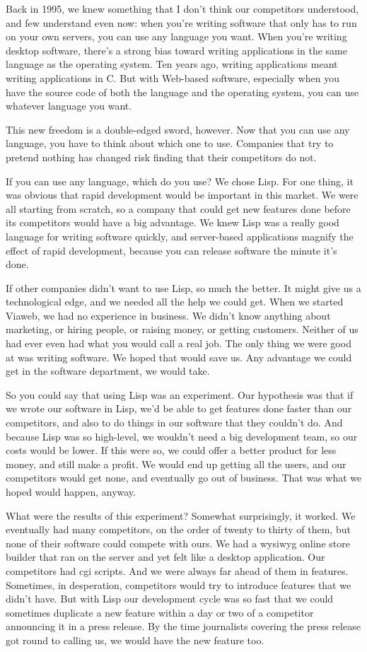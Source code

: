 Back in 1995, we knew something that I don't think our competitors
understood, and few understand even now: when you're writing software
that only has to run on your own servers, you can use any language you
want. When you're writing desktop software, there's a strong bias toward
writing applications in the same language as the operating system. Ten
years ago, writing applications meant writing applications in C. But
with Web-based software, especially when you have the source code of
both the language and the operating system, you can use whatever
language you want.

This new freedom is a double-edged sword, however. Now that you can use
any language, you have to think about which one to use. Companies that
try to pretend nothing has changed risk finding that their competitors
do not.

If you can use any language, which do you use? We chose Lisp. For one
thing, it was obvious that rapid development would be important in this
market. We were all starting from scratch, so a company that could get
new features done before its competitors would have a big advantage. We
knew Lisp was a really good language for writing software quickly, and
server-based applications magnify the effect of rapid development,
because you can release software the minute it's done.

If other companies didn't want to use Lisp, so much the better. It might
give us a technological edge, and we needed all the help we could get.
When we started Viaweb, we had no experience in business. We didn't know
anything about marketing, or hiring people, or raising money, or getting
customers. Neither of us had ever even had what you would call a real
job. The only thing we were good at was writing software. We hoped that
would save us. Any advantage we could get in the software department, we
would take.

So you could say that using Lisp was an experiment. Our hypothesis was
that if we wrote our software in Lisp, we'd be able to get features done
faster than our competitors, and also to do things in our software that
they couldn't do. And because Lisp was so high-level, we wouldn't need a
big development team, so our costs would be lower. If this were so, we
could offer a better product for less money, and still make a profit. We
would end up getting all the users, and our competitors would get none,
and eventually go out of business. That was what we hoped would happen,
anyway.

What were the results of this experiment? Somewhat surprisingly, it
worked. We eventually had many competitors, on the order of twenty to
thirty of them, but none of their software could compete with ours. We
had a wysiwyg online store builder that ran on the server and yet felt
like a desktop application. Our competitors had cgi scripts. And we were
always far ahead of them in features. Sometimes, in desperation,
competitors would try to introduce features that we didn't have. But
with Lisp our development cycle was so fast that we could sometimes
duplicate a new feature within a day or two of a competitor announcing
it in a press release. By the time journalists covering the press
release got round to calling us, we would have the new feature too.

